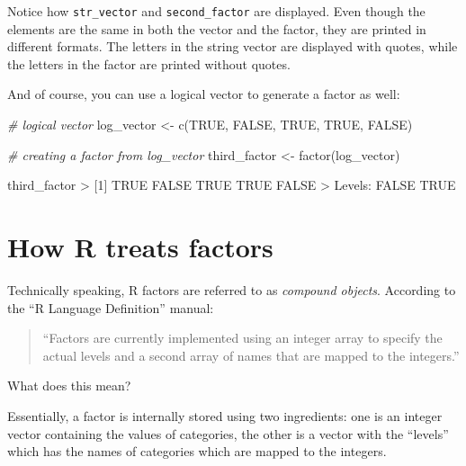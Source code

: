 \documentclass[
]{book}
\newenvironment{Shaded}{\begin{snugshade}}{\end{snugshade}}
\newcommand{\CommentTok}[1]{\textcolor[rgb]{0.56,0.35,0.01}{\textit{#1}}}
\newcommand{\ConstantTok}[1]{\textcolor[rgb]{0.00,0.00,0.00}{#1}}
\newcommand{\DecValTok}[1]{\textcolor[rgb]{0.00,0.00,0.81}{#1}}
\newcommand{\FunctionTok}[1]{\textcolor[rgb]{0.00,0.00,0.00}{#1}}
\newcommand{\NormalTok}[1]{#1}
\newcommand{\OtherTok}[1]{\textcolor[rgb]{0.56,0.35,0.01}{#1}}
\newcommand{\SpecialCharTok}[1]{\textcolor[rgb]{0.00,0.00,0.00}{#1}}
\begin{document}
Notice how \texttt{str\_vector} and \texttt{second\_factor} are displayed. Even though the
elements are the same in both the vector and the factor, they are printed in
different formats. The letters in the string vector are displayed with quotes,
while the letters in the factor are printed without quotes.

And of course, you can use a logical vector to generate a factor as well:

\begin{Shaded}
\begin{Highlighting}[]
\CommentTok{\# logical vector}
\NormalTok{log\_vector }\OtherTok{\textless{}{-}} \FunctionTok{c}\NormalTok{(}\ConstantTok{TRUE}\NormalTok{, }\ConstantTok{FALSE}\NormalTok{, }\ConstantTok{TRUE}\NormalTok{, }\ConstantTok{TRUE}\NormalTok{, }\ConstantTok{FALSE}\NormalTok{)}

\CommentTok{\# creating a factor from log\_vector}
\NormalTok{third\_factor }\OtherTok{\textless{}{-}} \FunctionTok{factor}\NormalTok{(log\_vector)}

\NormalTok{third\_factor}
\SpecialCharTok{\textgreater{}}\NormalTok{ [}\DecValTok{1}\NormalTok{] }\ConstantTok{TRUE}  \ConstantTok{FALSE} \ConstantTok{TRUE}  \ConstantTok{TRUE}  \ConstantTok{FALSE}
\SpecialCharTok{\textgreater{}}\NormalTok{ Levels}\SpecialCharTok{:} \ConstantTok{FALSE} \ConstantTok{TRUE}
\end{Highlighting}
\end{Shaded}

\hypertarget{how-r-treats-factors}{%
\section{How R treats factors}\label{how-r-treats-factors}}

Technically speaking, R factors are referred to as \emph{compound objects}. According
to the ``R Language Definition'' manual:

\begin{quote}
``Factors are currently implemented using an integer array to specify the
actual levels and a second array of names that are mapped to the integers.''
\end{quote}

What does this mean?

Essentially, a factor is internally stored using two ingredients: one is an
integer vector containing the values of categories, the other is a vector with
the ``levels'' which has the names of categories which are mapped to the integers.
\end{document}
